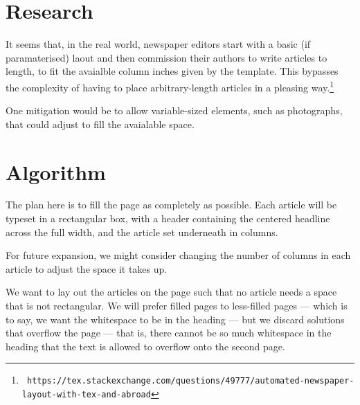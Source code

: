 \documentclass[a4paper]{scrartcl}
\begin{document}
\section{Research}

It seems that, in the real world, newspaper editors start with a basic
(if paramaterised) laout and then commission their authors to write
articles to length, to fit the avaialble column inches given by the
template. This bypasses the complexity of having to place
arbitrary-length articles in a pleasing way.\footnote{\texttt{\tiny
    https://tex.stackexchange.com/questions/49777/automated-newspaper-layout-with-tex-and-abroad}}

One mitigation would be to allow variable-sized elements, such as
photographs, that could adjust to fill the avaialable space.


\section{Algorithm}

The plan here is to fill the page as completely as possible. Each
article will be typeset in a rectangular box, with a header containing
the centered headline across the full width, and the article set
underneath in columns.

For future expansion, we might consider changing the number of columns
in each article to adjust the space it takes up.

We want to lay out the articles on the page such that no article needs
a space that is not rectangular. We will prefer filled pages to
less-filled pages --- which is to say, we want the whitespace to be in
the heading --- but we discard solutions that overflow the page ---
that is, there cannot be so much whitespace in the heading that the
text is allowed to overflow onto the second page.
\end{document}
